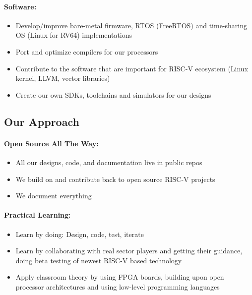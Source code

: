 \documentclass{article}
\begin{document}
\paragraph{Software:}

\begin{itemize}
    \item Develop/improve bare-metal firmware, RTOS (FreeRTOS) and time-sharing OS (Linux for RV64) implementations
    \item Port and optimize compilers for our processors
    \item Contribute to the software that are important for RISC-V ecosystem (Linux kernel, LLVM, vector libraries)
    \item Create our own SDKs, toolchains and simulators for our designs
\end{itemize}

\subsection{Our Approach}

\paragraph{Open Source All The Way:}

\begin{itemize}
    \item All our designs, code, and documentation live in public repos
    \item We build on and contribute back to open source RISC-V projects
    \item We document everything
\end{itemize}

\paragraph{Practical Learning:}

\begin{itemize}
    \item Learn by doing: Design, code, test, iterate
    \item Learn by collaborating with real sector players and getting their guidance, doing beta testing of newest RISC-V based technology
    \item Apply classroom theory by using FPGA boards, building upon open processor architectures and using low-level programming languages
\end{itemize}
\end{document}
